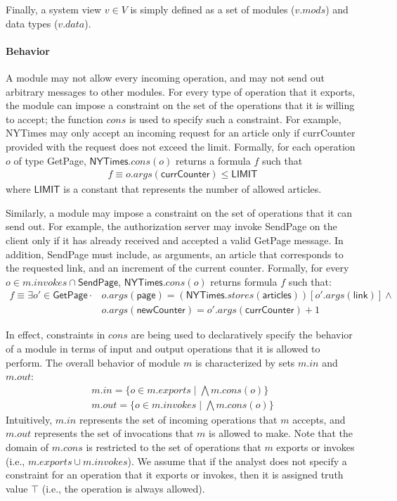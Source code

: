 Finally, a system view $v \in V$ is simply defined as a set of modules
($v.mods$) and data types ($v.data$). 

\paragraph{\textbf{Behavior}} A module may not allow every incoming
operation, and may not send out arbitrary messages to other
modules. For every type of operation that it exports, the module can
impose a constraint on the set of the operations that it is willing to
accept; the function $cons$ is used to specify such a constraint. For
example, \textsf{NYTimes} may only accept an incoming request for an
article only if \textsf{currCounter} provided with the request does
not exceed the limit. Formally, for each operation $o$ of type
\textsf{GetPage}, $\textsf{NYTimes}.cons(o)$ returns a formula $f$
such that
\begin{align*}
f \equiv o.args(\textsf{currCounter}) \leq \textsf{LIMIT}
\end{align*}
where $\textsf{LIMIT}$ is a constant that represents the number of
allowed articles.

Similarly, a module may impose a constraint on the set of operations
that it can send out. For example, the authorization server may invoke
\textsf{SendPage} on the client only if it has already received and
accepted a valid \textsf{GetPage} message. In addition,
\textsf{SendPage} must include, as arguments, an article that
corresponds to the requested link, and an increment of the current
counter. Formally, for every $o \in m.invokes \cap \textsf{SendPage}$,
$\textsf{NYTimes}.cons(o)$ returns formula $f$ such that:
\begin{align*}
f \equiv \exists o' \in \textsf{GetPage} \cdot & o.args(\textsf{page}) =
(\textsf{NYTimes}.stores(\textsf{articles}))[o'.args(\textsf{link})]
\land \\
& o.args(\textsf{newCounter}) = o'.args(\textsf{currCounter}) + 1
\end{align*}

In effect, constraints in $cons$ are being used to
declaratively specify the behavior of a module in terms of input and
output operations that it is allowed to perform. The overall behavior
of module $m$ is characterized by sets $m.in$ and $m.out$:
\begin{align*}
m.in = \{ o \in m.exports \;|\; \bigwedge m.cons(o) \} \\
m.out = \{ o \in m.invokes \;|\; \bigwedge m.cons(o) \}
\end{align*}
Intuitively, $m.in$ represents the set of incoming operations that $m$
accepts, and $m.out$ represents the set of invocations that $m$ is
allowed to make. Note that the domain of $m.cons$ is restricted to
the set of operations that $m$ exports or invokes (i.e., $m.exports
\cup m.invokes$). We assume that if the analyst does not specify a
constraint for an operation that it exports or invokes,
then it is assigned truth value $\top$ (i.e., the operation is always
allowed).


